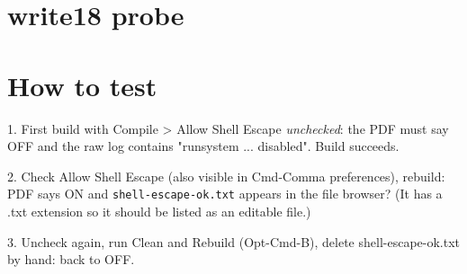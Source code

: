 \documentclass{article}
\begin{document}
\section{write18 probe}
\immediate{}


\section{How to test}
1. First build with Compile > Allow Shell Escape \emph{unchecked}: the PDF must say OFF
and the raw log contains "runsystem ... disabled". Build succeeds.

2. Check Allow Shell Escape (also visible in Cmd-Comma preferences), rebuild: PDF says ON
and \texttt{shell-escape-ok.txt} appears in the file browser? (It has a .txt
extension so it should be listed as an editable file.)

3. Uncheck again, run Clean and Rebuild (Opt-Cmd-B), delete shell-escape-ok.txt by hand:
back to OFF.
\end{document}
